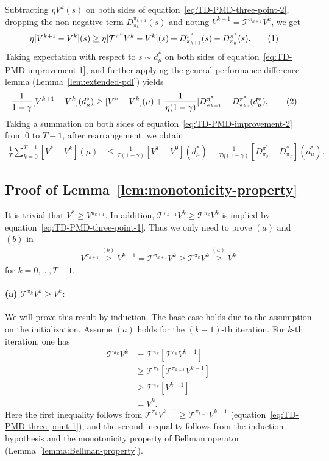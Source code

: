 \documentclass[10pt]{article}
\newcommand{\calT}{\mathcal{T}}
\newcommand\numberthis{\addtocounter{equation}{1}\tag{\theequation}}
\theoremstyle{plain}
\theoremstyle{definition}
\begin{document}
Subtracting $\eta V^k(s)$ on both sides of equation~\eqref{eq:TD-PMD-three-point-2}, dropping the non-negative term $D^{\pi_{k+1}}_{\pi_k}(s)$ and noting $V^{k+1} = \calT^{\pi_{k+1}} V^k$, we get
\begin{align*}
    \eta [V^{k+1} - V^k](s) &\geq \eta [\calT^{\pi^*} V^k - V^k](s) + D^{\pi^*}_{\pi_{k+1}}(s) - D^{\pi^*}_{\pi_k}(s). \numberthis \label{eq:TD-PMD-improvement-1}
\end{align*}
 Taking expectation with respect to  $s\sim d^*_\mu$ on both sides of equation~\eqref{eq:TD-PMD-improvement-1}, and further applying the general performance difference lemma (Lemma~\ref{lem:extended-pdl}) yields
\begin{align*}
    \frac{1}{1-\gamma} [V^{k+1} - V^k](d^*_\mu) &\geq [V^* - V^k](\mu) + \frac{1}{\eta(1-\gamma)} [D^{\pi^*}_{\pi_{k+1}} - D^{\pi^*}_{\pi_k}](d^*_\mu), \numberthis \label{eq:TD-PMD-improvement-2}
\end{align*}
Taking a summation on both sides of equation~\eqref{eq:TD-PMD-improvement-2}  from $0$ to $T-1$, after rearrangement, we obtain
\begin{align*}
    \frac{1}{T}\sum_{k=0}^{T-1} [V^* - V^k](\mu) &\leq \frac{1}{T(1-\gamma)} [V^{T} - V^0](d^*_\mu) + \frac{1}{T\eta(1-\gamma)}[D^{\pi^*}_{\pi_0} - D^*_{\pi_{T}}](d^*_\mu).
\end{align*}


\subsection{Proof of Lemma~\ref{lem:monotonicity-property}}
\label{sec:pf:lem:monotonicity-property}
It is trivial that $V^* \geq V^{\pi_{k+1}}$. In addition,  $\calT^{\pi_{k+1}} V^k \geq \calT^{\pi_k} V^k$ is implied by equation~\eqref{eq:TD-PMD-three-point-1}. Thus we only need to prove $(a)$ and $(b)$ in
\begin{align*}
    V^{\pi_{k+1}} \stackrel{(b)}{\geq} V^{k+1} = \calT^{\pi_{k+1}} V^k \geq \calT^{\pi_k} V^k \stackrel{(a)}{\geq} V^k
\end{align*}
for $k=0,...,T-1$.

\paragraph{(a) $\calT^{\pi_k} V^k \geq V^k$:} We will prove this result by induction. The base case holds due to the assumption on the initialization. Assume  $(a)$  holds for the $(k-1)$-th iteration. For $k$-th iteration, one has
\begin{align*}
    \calT^{\pi_k} V^k &= \calT^{\pi_k} [\calT^{\pi_k} V^{k-1}] \\
    &\geq \calT^{\pi_k} [\calT^{\pi_{k-1}} V^{k-1}] \\
    &\geq \calT^{\pi_k} [V^{k-1}] \\
    & = V^k.
\end{align*}
Here the first inequality follows from $\calT^{\pi_k} V^{k-1} \geq \calT^{\pi_{k-1}}V^{k-1}$ (equation~\eqref{eq:TD-PMD-three-point-1}), and the second inequality follows from the induction hypothesis and the monotonicity property of Bellman operator (Lemma~\ref{lemma:Bellman-property}).
\end{document}
